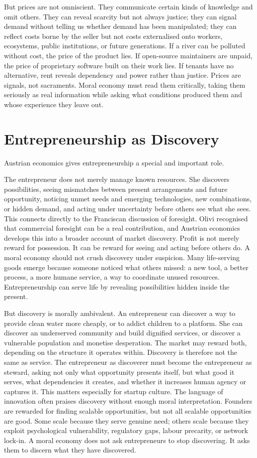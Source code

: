 \documentclass[11pt,a4paper,oneside]{book}
\begin{document}
But prices are not omniscient. They communicate certain kinds of knowledge and omit others. They can reveal scarcity but not always justice; they can signal demand without telling us whether demand has been manipulated; they can reflect costs borne by the seller but not costs externalised onto workers, ecosystems, public institutions, or future generations. If a river can be polluted without cost, the price of the product lies. If open-source maintainers are unpaid, the price of proprietary software built on their work lies. If tenants have no alternative, rent reveals dependency and power rather than justice. Prices are signals, not sacraments. Moral economy must read them critically, taking them seriously as real information while asking what conditions produced them and whose experience they leave out.

\section*{Entrepreneurship as Discovery}

Austrian economics gives entrepreneurship a special and important role.

The entrepreneur does not merely manage known resources. She discovers possibilities, seeing mismatches between present arrangements and future opportunity, noticing unmet needs and emerging technologies, new combinations, or hidden demand, and acting under uncertainty before others see what she sees. This connects directly to the Franciscan discussion of foresight. Olivi recognised that commercial foresight can be a real contribution, and Austrian economics develops this into a broader account of market discovery. Profit is not merely reward for possession. It can be reward for seeing and acting before others do. A moral economy should not crush discovery under suspicion. Many life-serving goods emerge because someone noticed what others missed: a new tool, a better process, a more humane service, a way to coordinate unused resources. Entrepreneurship can serve life by revealing possibilities hidden inside the present.

But discovery is morally ambivalent. An entrepreneur can discover a way to provide clean water more cheaply, or to addict children to a platform. She can discover an underserved community and build dignified services, or discover a vulnerable population and monetise desperation. The market may reward both, depending on the structure it operates within. Discovery is therefore not the same as service. The entrepreneur as discoverer must become the entrepreneur as steward, asking not only what opportunity presents itself, but what good it serves, what dependencies it creates, and whether it increases human agency or captures it. This matters especially for startup culture. The language of innovation often praises discovery without enough moral interpretation. Founders are rewarded for finding scalable opportunities, but not all scalable opportunities are good. Some scale because they serve genuine need; others scale because they exploit psychological vulnerability, regulatory gaps, labour precarity, or network lock-in. A moral economy does not ask entrepreneurs to stop discovering. It asks them to discern what they have discovered.
\end{document}
